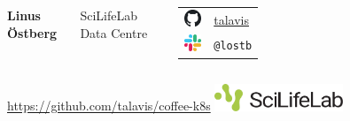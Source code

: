 \documentclass{dcpresentation}
\newcommand\framenode[2][10pt]{
    \fill[white,path fading=fade u] (#2.south west) rectangle ($(#2.south east)+(0, #1)$);
    \fill[white,path fading=fade d] (#2.north west) rectangle ($(#2.north east)+(0,-#1)$);
    \fill[white,path fading=fade l] (#2.south east) rectangle ($(#2.north east)+(-#1,0)$);
    \fill[white,path fading=fade r] (#2.south west) rectangle ($(#2.north west)+( #1,0)$);
}
\begin{document}
\begin{frame}
 \begin{columns}
  {\Large \bf Linus Östberg}
  
  {\small SciLifeLab Data Centre}

  \vspace{20pt}
  
  \begin{tabular}{cl}
   \includegraphics[height=0.5cm]{img/github.pdf} & \href{https://github.com/talavis}{talavis} \\
   \includegraphics[height=0.5cm]{img/slack.pdf} & \texttt{@lostb} \\
  \end{tabular}
 \end{columns}
 
 \vspace{50pt}
 
 \begin{columns}
 {\tiny \url{https://github.com/talavis/coffee-k8s}}
  \includegraphics[height=0.8cm]{img/scilifelab-logo.pdf}
  \end{columns}
\end{frame}
\end{document}

